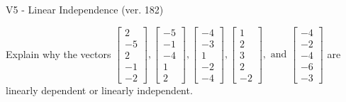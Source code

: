 \begin{exercise}
  \begin{exerciseTitle}V5 - Linear Independence (ver. 182)\end{exerciseTitle}
  \begin{exerciseStatement}
    Explain why the vectors \(\left[\begin{array}{r}
2 \\
-5 \\
2 \\
-1 \\
-2
\end{array}\right] , \left[\begin{array}{r}
-5 \\
-1 \\
-4 \\
1 \\
2
\end{array}\right] , \left[\begin{array}{r}
-4 \\
-3 \\
1 \\
-2 \\
-4
\end{array}\right] , \left[\begin{array}{r}
1 \\
2 \\
3 \\
2 \\
-2
\end{array}\right] , \text{ and } \left[\begin{array}{r}
-4 \\
-2 \\
-4 \\
-6 \\
-3
\end{array}\right]\) are linearly dependent or linearly independent.	



\end{exerciseStatement}
\end{exercise}

